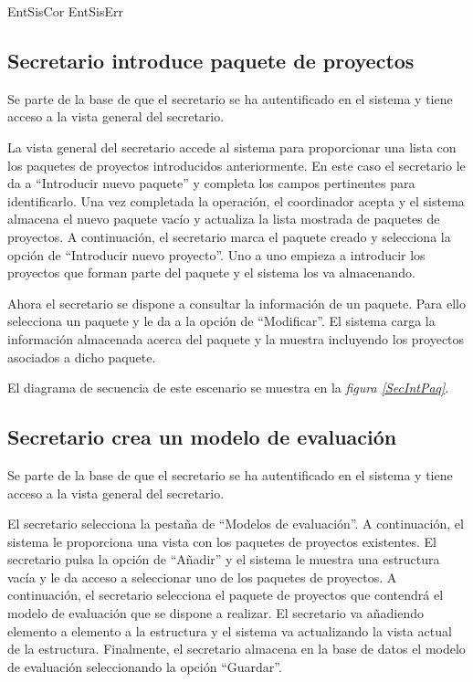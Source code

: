 \documentclass[11pt,a4paper,spanish,twoside]{book}
\begin{document}
{EntSisCor}
{EntSisErr}

\subsection{Secretario introduce paquete de proyectos}
Se parte de la base de que el secretario se ha autentificado en el sistema y
tiene acceso a la vista general del secretario.

La vista general del secretario accede al sistema para proporcionar una
lista con los paquetes de proyectos introducidos anteriormente. En este caso
el secretario le da a ``Introducir nuevo paquete'' y completa los campos
pertinentes para identificarlo. Una vez completada la operación, el
coordinador acepta y el sistema almacena el nuevo paquete vacío y actualiza
la lista mostrada de paquetes de proyectos. A continuación, el secretario
marca el paquete creado y selecciona la opción de ``Introducir nuevo 
proyecto''. Uno a uno empieza a introducir los proyectos que forman parte del
paquete y el sistema los va almacenando.

Ahora el secretario se dispone a consultar la información de un paquete.
Para ello selecciona un paquete y le da a la opción de ``Modificar''. El
sistema carga la información almacenada acerca del paquete y la muestra
incluyendo los proyectos asociados a dicho paquete.

El diagrama de secuencia de este escenario se muestra en la \emph{figura
\ref{SecIntPaq}}.


\subsection{Secretario crea un modelo de evaluación}
Se parte de la base de que el secretario se ha autentificado en el sistema y
tiene acceso a la vista general del secretario.

El secretario selecciona la pestaña de ``Modelos de evaluación''. A
continuación, el sistema le proporciona una vista con los paquetes de
proyectos existentes. El secretario pulsa la opción de ``Añadir'' y el sistema
le muestra una estructura vacía y le da acceso a seleccionar uno de los
paquetes de proyectos. A continuación, el secretario selecciona el paquete de
proyectos que contendrá el modelo de evaluación que se dispone a realizar.
El secretario va añadiendo elemento a elemento a la estructura y el sistema
va actualizando la vista actual de la estructura. Finalmente, el secretario
almacena en la base de datos el modelo de evaluación seleccionando la opción
``Guardar''.
\end{document}
